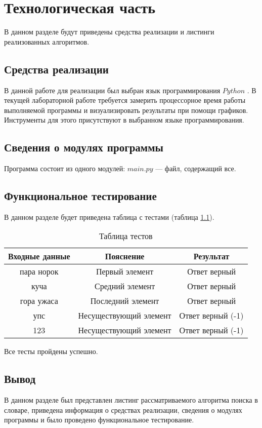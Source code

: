 \chapter{Технологическая часть}
В данном разделе будут приведены средства реализации и листинги реализованных алгоритмов.

\section{Средства реализации}
В данной работе для реализации был выбран язык программирования $Python$ \cite{pythonlang}. В текущей лабораторной работе требуется замерить процессорное время работы выполняемой программы
и визуализировать результаты при помощи графиков. Инструменты для этого присутствуют в выбранном языке программирования.

\section{Сведения о модулях программы}
Программа состоит из одного модулей: $main.py$ --- файл, содержащий все.

\section{Функциональное тестирование}

В данном разделе будет приведена таблица с тестами (таблица \ref{table:ref1}).
\begin{center}
	\captionsetup{justification=raggedright,singlelinecheck=off}
	\begin{table}[ht]
		\centering
		\caption{Таблица тестов}
		\label{table:ref1}
		\begin{tabular}{ |c|c|c|}
			\hline
			Входные данные    & Пояснение   	  & Результат    \\ 
			\hline
			пара норок			  & Первый элемент   & Ответ верный \\ \hline
			куча 			  & Средний элемент    & Ответ верный \\ \hline
			гора ужаса 		  & Последний элемент & Ответ верный \\ \hline
			упс & Несуществующий элемент & Ответ верный (-1) \\ \hline
			123 & Несуществующий элемент & Ответ верный (-1) \\ \hline
		\end{tabular}
	\end{table}
\end{center}
Все тесты пройдены успешно.


\section{Вывод}
В данном разделе был представлен листинг рассматриваемого алгоритма поиска в словаре, приведена информация о средствах реализации, сведения о модулях программы и было проведено функциональное тестирование.